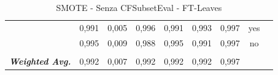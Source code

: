 \begin{table}[htbp]
{\begin{tabular}{rrrrrrrrr}
				\multicolumn{1}{c}{} & \multicolumn{1}{c}{0,991} & \multicolumn{1}{c}{0,005} & \multicolumn{1}{c}{0,996} & \multicolumn{1}{c}{0,991} & \multicolumn{1}{c}{0,993} & \multicolumn{1}{c}{0,997} & \multicolumn{1}{c}{yes} &  \\
				\multicolumn{1}{c}{} & \multicolumn{1}{c}{0,995} & \multicolumn{1}{c}{0,009} & \multicolumn{1}{c}{0,988} & \multicolumn{1}{c}{0,995} & \multicolumn{1}{c}{0,991} & \multicolumn{1}{c}{0,997} & \multicolumn{1}{c}{no} &  \\
				\multicolumn{1}{c}{} & \multicolumn{1}{c}{} & \multicolumn{1}{c}{} & \multicolumn{1}{c}{} & \multicolumn{1}{c}{} & \multicolumn{1}{c}{} & \multicolumn{1}{c}{} & \multicolumn{1}{c}{} &  \\
				\multicolumn{1}{c}{\textit{\textbf{Weighted Avg.}}} & \multicolumn{1}{c}{0,992} & \multicolumn{1}{c}{0,007} & \multicolumn{1}{c}{0,992} & \multicolumn{1}{c}{0,992} & \multicolumn{1}{c}{0,992} & \multicolumn{1}{c}{0,997} & \multicolumn{1}{c}{} &  \\
			\end{tabular}%
	}
	\label{tab:FTLeavesExtend}%
	\caption{ SMOTE - Senza CFSubsetEval - FT-Leaves}
\end{table}%

